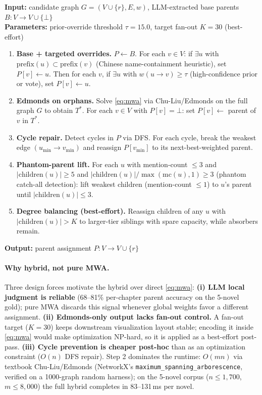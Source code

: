 \documentclass[11pt]{article}
\begin{document}
\begin{algorithm}[h]
\caption{Edmonds-Augmented Hierarchy Resolution}
\label{alg:edmonds-hybrid}
\scriptsize
\textbf{Input:} candidate graph $G = (V \cup \{r\}, E, w)$, LLM-extracted base
parents $B: V \rightarrow V \cup \{\bot\}$ \\
\textbf{Parameters:} prior-override threshold $\tau = 15.0$, target fan-out
$K = 30$ (best-effort)
\begin{enumerate}
\item \textbf{Base + targeted overrides.}\quad
  $P \leftarrow B$. For each $v \in V$: if $\exists u$ with
  $\text{prefix}(u) \subset \text{prefix}(v)$ (Chinese
  name-containment heuristic), set $P[v] \leftarrow u$. Then
  for each $v$, if $\exists u$ with $w(u \rightarrow v) \geq \tau$
  (high-confidence prior or vote), set $P[v] \leftarrow u$.
\item \textbf{Edmonds on orphans.}\quad
  Solve \autoref{eq:mwa} via Chu-Liu/Edmonds on the full graph $G$ to obtain
  $T^*$. For each $v \in V$ with $P[v] = \bot$: set $P[v] \leftarrow$
  parent of $v$ in $T^*$.
\item \textbf{Cycle repair.}\quad
  Detect cycles in $P$ via DFS. For each cycle, break the weakest edge
  $(u_{\min} \rightarrow v_{\min})$ and reassign $P[v_{\min}]$ to its
  next-best-weighted parent.
\item \textbf{Phantom-parent lift.}\quad
  For each $u$ with mention-count $\leq 3$ and $|\text{children}(u)| \geq 5$
  and $|\text{children}(u)| / \max(\text{mc}(u), 1) \geq 3$ (phantom
  catch-all detection): lift weakest children
  (mention-count $\leq 1$) to $u$'s parent until $|\text{children}(u)| \leq 3$.
\item \textbf{Degree balancing (best-effort).}\quad
  Reassign children of any $u$ with $|\text{children}(u)| > K$
  to larger-tier siblings with spare capacity, while absorbers remain.
\end{enumerate}
\textbf{Output:} parent assignment $P: V \rightarrow V \cup \{r\}$
\end{algorithm}

\paragraph{Why hybrid, not pure MWA.}
Three design forces motivate the hybrid over direct \autoref{eq:mwa}:
\textbf{(i) LLM local judgment is reliable} (68--81\% per-chapter parent
accuracy on the 5-novel gold); pure MWA discards this signal whenever global
weights favor a different assignment.
\textbf{(ii) Edmonds-only output lacks fan-out control.} A fan-out
target ($K = 30$) keeps downstream visualization layout stable; encoding it
inside \autoref{eq:mwa} would make optimization NP-hard, so it is applied
as a best-effort post-pass.
\textbf{(iii) Cycle prevention is cheaper post-hoc} than as an optimization constraint ($O(n)$ DFS repair).
Step 2 dominates the runtime: $O(mn)$ via textbook Chu-Liu/Edmonds (NetworkX's
\texttt{maximum\_spanning\_arborescence}, verified on a 1000-graph random
harness); on the 5-novel corpus ($n \leq 1{,}700$, $m \leq 8{,}000$) the full
hybrid completes in 83--131\,ms per novel.
\end{document}
